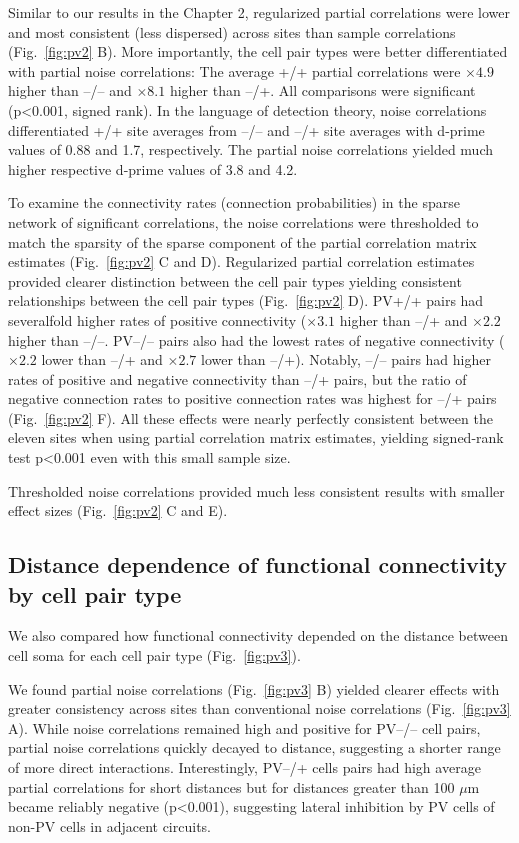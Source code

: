 Similar to our results in the Chapter 2, regularized partial correlations  were lower and most consistent (less dispersed) across sites than sample correlations (Fig.~\ref{fig:pv2} B).
More importantly, the cell pair types were better differentiated with partial noise correlations: 
The average +/+ partial correlations were $\times 4.9$ higher than --/-- and $\times 8.1$ higher than --/+.  
All comparisons were significant (p<0.001, signed rank).
In the language of detection theory, noise correlations differentiated  +/+ site averages from --/-- and --/+ site averages with d-prime values of 0.88 and 1.7, respectively. The partial noise correlations yielded much higher respective d-prime values of 3.8 and 4.2. 

To examine the connectivity rates (connection probabilities) in the sparse network of significant correlations, the noise correlations were thresholded to match the sparsity of the sparse component of the  partial correlation matrix estimates (Fig.~\ref{fig:pv2} C and D). 
Regularized partial correlation estimates provided clearer distinction between the cell pair types yielding consistent relationships between the cell pair types (Fig.~\ref{fig:pv2} D). PV+/+ pairs had severalfold higher rates of positive connectivity ($\times 3.1$ higher than --/+ and $\times 2.2$ higher than --/--. PV--/-- pairs also had the lowest rates of negative connectivity ($\times 2.2$ lower than --/+ and $\times 2.7$ lower than --/+). Notably, --/-- pairs had higher rates of positive and negative connectivity than --/+ pairs, but the ratio of negative connection rates to positive connection rates was highest for --/+ pairs (Fig.~\ref{fig:pv2} F).   All these effects were nearly perfectly consistent between the eleven sites when using partial correlation matrix estimates, yielding signed-rank test p<0.001 even with this small sample size.

Thresholded noise correlations provided much less consistent results with smaller effect sizes (Fig.~\ref{fig:pv2} C and E).

\subsection{Distance dependence of functional connectivity by cell pair type}
We also compared how functional connectivity depended on the distance between cell soma for each cell pair type (Fig.~\ref{fig:pv3}). 

We found partial noise correlations (Fig.~\ref{fig:pv3} B)  yielded clearer effects with greater consistency across sites than conventional noise correlations (Fig.~\ref{fig:pv3} A). While noise correlations remained high and positive for PV--/-- cell pairs, partial noise correlations quickly decayed to distance, suggesting a shorter range of more direct interactions. Interestingly, PV--/+ cells pairs had high average partial correlations for short distances but for distances greater than 100 $\mu$m became reliably negative (p<0.001), suggesting lateral inhibition by PV cells of non-PV cells in adjacent circuits.


